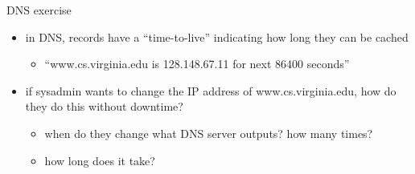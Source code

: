 \begin{frame}{DNS exercise}
    \begin{itemize}
    \item in DNS, records have a ``time-to-live''
        indicating how long they can be cached
            \begin{itemize}
            \item ``www.cs.virginia.edu is 128.148.67.11 for next 86400 seconds''
            \end{itemize}
    \vspace{.5cm}
    \item if sysadmin wants to change the IP address of www.cs.virginia.edu,
            how do they do this without downtime?
        \begin{itemize}
        \item when do they change what DNS server outputs? how many times?
        \item how long does it take?
        \end{itemize}
    \end{itemize}
\end{frame}
